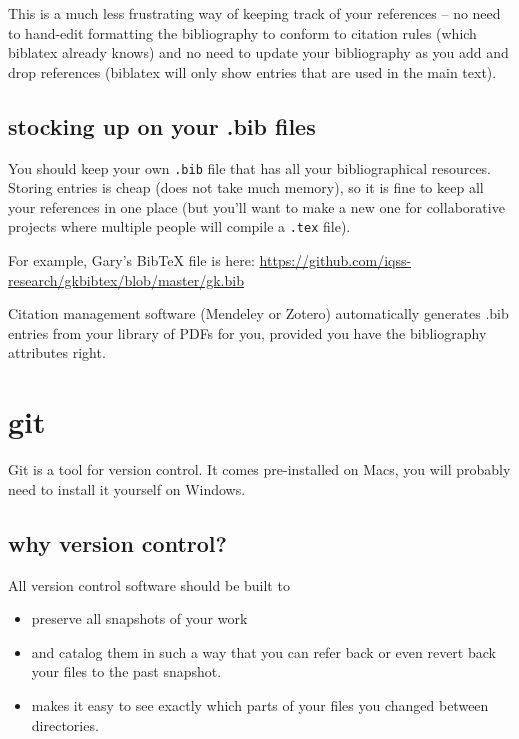 \documentclass[]{book}
\providecommand{\tightlist}{%
  \setlength{\itemsep}{0pt}\setlength{\parskip}{0pt}}
\theoremstyle{definition}
\theoremstyle{definition}
\theoremstyle{definition}
\theoremstyle{remark}
\begin{document}
This is a much less frustrating way of keeping track of your references
-- no need to hand-edit formatting the bibliography to conform to
citation rules (which biblatex already knows) and no need to update your
bibliography as you add and drop references (biblatex will only show
entries that are used in the main text).

\subsection{stocking up on your .bib
files}\label{stocking-up-on-your-.bib-files}

You should keep your own \texttt{.bib} file that has all your
bibliographical resources. Storing entries is cheap (does not take much
memory), so it is fine to keep all your references in one place (but
you'll want to make a new one for collaborative projects where multiple
people will compile a \texttt{.tex} file).

For example, Gary's BibTeX file is here:
\url{https://github.com/iqss-research/gkbibtex/blob/master/gk.bib}

Citation management software (Mendeley or Zotero) automatically
generates .bib entries from your library of PDFs for you, provided you
have the bibliography attributes right.

\section{git}\label{git}

Git is a tool for version control. It comes pre-installed on Macs, you
will probably need to install it yourself on Windows.

\subsection{why version control?}\label{why-version-control}

All version control software should be built to

\begin{itemize}
\tightlist
\item
  preserve all snapshots of your work
\item
  and catalog them in such a way that you can refer back or even revert
  back your files to the past snapshot.
\item
  makes it easy to see exactly which parts of your files you changed
  between directories.
\end{itemize}
\end{document}
